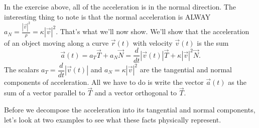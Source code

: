 In the exercise above, all of the acceleration is in the normal direction. The interesting thing to note is that the normal acceleration is ALWAY $a_N =  \frac{|\vec v|^2}{\rho}=\kappa |\vec v|^2$.  That's what we'll now show.
We'll show that the acceleration of an object moving along a curve $\vec r(t)$ with velocity $\vec v(t)$ is the sum
$$\vec a(t) = a_T\vec T+a_N\vec N=\frac{d}{dt}|\vec v(t)| \vec T + \kappa |\vec v|^2 \vec N.$$
The scalars $a_T=\dfrac{d}{dt}|\vec v(t)|$ and $a_N=\kappa |\vec v|^2$ 
are the tangential and normal components of acceleration.  All we have to do is write the vector $\vec a(t)$ as the sum of a vector parallel to $\vec T$ and a vector orthogonal to $\vec T$. 

Before we decompose the acceleration into its tangential and normal components, let's look at two examples to see what these facts physically represent.



% 

